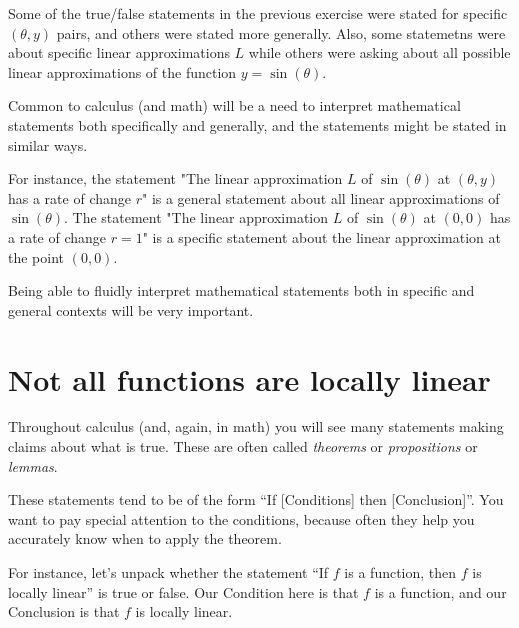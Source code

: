 \documentclass{ximera}
\begin{document}
\begin{remark}
    Some of the true/false statements in the previous exercise were stated for specific $(\theta,y)$ pairs, and others were stated more generally. Also, some statemetns were about specific linear approximations $L$ while others were asking about all possible linear approximations of the function $y=\sin(\theta)$.

    Common to calculus (and math) will be a need to interpret mathematical statements both specifically and generally, and the statements might be stated in similar ways.

    For instance, the statement "The linear approximation $L$ of $\sin(\theta)$ at $(\theta,y)$ has a rate of change $r$" is a general statement about all linear approximations of $\sin(\theta)$. The statement "The linear approximation $L$ of $\sin(\theta)$ at $(0,0)$ has a rate of change $r=1$" is a specific statement about the linear approximation at the point $(0,0)$.

    Being able to fluidly interpret mathematical statements both in specific and general contexts will be very important.
\end{remark}

\section{Not all functions are locally linear}
Throughout calculus (and, again, in math) you will see many statements making claims about what is true. These are often called \emph{theorems} or \emph{propositions} or \emph{lemmas}. 

These statements tend to be of the form ``If [Conditions] then [Conclusion]''. You want to pay special attention to the conditions, because often they help you accurately know when to apply the theorem. 

For instance, let's unpack whether the statement ``If $f$ is a function, then $f$ is locally linear'' is true or false. Our Condition here is that $f$ is a function, and our Conclusion is that $f$ is locally linear.
\end{document}
